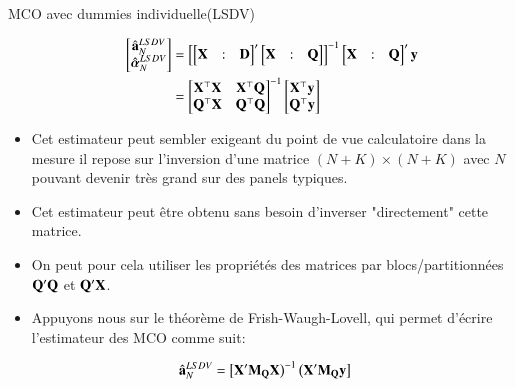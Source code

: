 \begin{frame}[allowframebreaks]{MCO avec dummies individuelle(LSDV)}
\begin{itemize}
          \begin{align*}
            \begin{bmatrix}
            \hat{{\mathbf a}}^{LSDV}_N\\
            \hat{{\boldsymbol \alpha}}^{LSDV}_N
            \end{bmatrix}
            &=\left[
            \begin{bmatrix}
            \mathbf X&:&  \mathbf D
            \end{bmatrix}^\prime
            \begin{bmatrix}
            \mathbf X&:& \mathbf Q
            \end{bmatrix}\right]^{-1}
            \begin{bmatrix}
            \mathbf X&:& \mathbf Q
            \end{bmatrix}^\prime{\mathbf y}\\
            &=
            \begin{bmatrix}
            \mathbf X^\top \bold X & \mathbf X^\top\mathbf Q\\
            \mathbf Q^\top\mathbf X&\mathbf Q^\top\mathbf Q
            \end{bmatrix}^{-1}
            \begin{bmatrix}
            \mathbf X^\top{\mathbf y}\\
            \mathbf Q^\top{\mathbf y}
            \end{bmatrix}
            \end{align*}

            \item Cet estimateur peut sembler exigeant du point 
de vue calculatoire dans la mesure il repose sur
 l'inversion d'une matrice $(N +K)\times (N+ K)$ avec $N$ 
 pouvant devenir très grand sur des panels typiques.
    
 \item Cet estimateur peut être obtenu sans besoin d'inverser  "directement" cette matrice. 
 
 \item On peut pour cela utiliser les propriétés des matrices par
 blocs/partitionnées $\mathbf Q^\prime\mathbf Q$ et $\mathbf Q^\prime\mathbf X$. 

\item Appuyons nous sur le théorème  de Frish-Waugh-Lovell,  
qui permet d'écrire l'estimateur des MCO comme suit:

\begin{align*}
    \hat{{\mathbf a}}^{LSDV}_N
    &=
    \left[
    \mathbf X^\prime\mathbf M_\mathbf Q\mathbf X
    \right)^{-1}
    \left(
    \mathbf X^\prime\mathbf M_\mathbf Q{\mathbf y}
    \right]
    \end{align*}


\end{itemize}
\end{frame}
